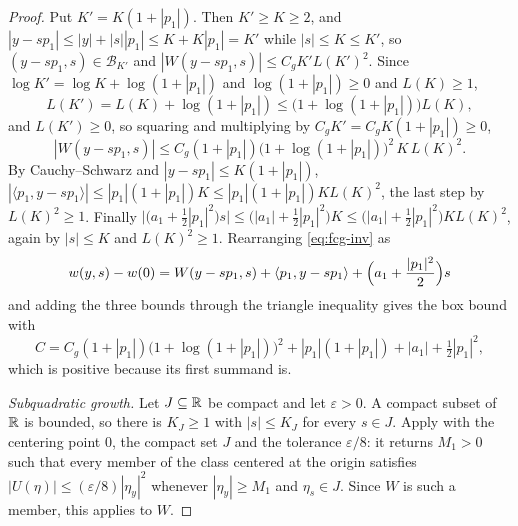 \begin{proof}
Put $K'=K(1+|p_1|)$. Then $K'\ge K\ge2$, and
$|y-sp_1|\le|y|+|s||p_1|\le K+K|p_1|=K'$ while $|s|\le K\le K'$, so
$(y-sp_1,s)\in\mathcal B_{K'}$ and
$|W(y-sp_1,s)|\le C_gK'L(K')^2$. Since $\log K'=\log K+\log(1+|p_1|)$ and
$\log(1+|p_1|)\ge0$ and $L(K)\ge1$,
\[
  L(K')=L(K)+\log(1+|p_1|)\le\bigl(1+\log(1+|p_1|)\bigr)L(K),
\]
and $L(K')\ge0$, so squaring and multiplying by $C_gK'=C_gK(1+|p_1|)\ge0$,
\[
  |W(y-sp_1,s)|\le C_g(1+|p_1|)\bigl(1+\log(1+|p_1|)\bigr)^2\,K\,L(K)^2 .
\]
By Cauchy--Schwarz and $|y-sp_1|\le K(1+|p_1|)$,
$|\langle p_1,y-sp_1\rangle|\le|p_1|(1+|p_1|)K\le|p_1|(1+|p_1|)KL(K)^2$, the
last step by $L(K)^2\ge1$. Finally
$\bigl|\bigl(a_1+\tfrac12|p_1|^2\bigr)s\bigr|
 \le\bigl(|a_1|+\tfrac12|p_1|^2\bigr)K
 \le\bigl(|a_1|+\tfrac12|p_1|^2\bigr)KL(K)^2$, again by $|s|\le K$ and
$L(K)^2\ge1$. Rearranging \eqref{eq:fcg-inv} as
\[
  w(y,s)-w(0)=W(y-sp_1,s)+\langle p_1,y-sp_1\rangle
    +\Bigl(a_1+\frac{|p_1|^2}{2}\Bigr)s
\]
and adding the three bounds through the triangle inequality gives the box bound
with
\[
  C=C_g(1+|p_1|)\bigl(1+\log(1+|p_1|)\bigr)^2+|p_1|(1+|p_1|)
     +|a_1|+\tfrac12|p_1|^2 ,
\]
which is positive because its first summand is.

\emph{Subquadratic growth.} Let $J\subseteq\mathbb{R}$ be compact and let
$\varepsilon>0$. A compact subset of $\mathbb{R}$ is bounded, so there is $K_J\ge1$ with
$|s|\le K_J$ for every $s\in J$. Apply  with the
centering point $0$, the compact set $J$ and the tolerance $\varepsilon/8$: it
returns $M_1>0$ such that every member of the class centered at the origin
satisfies $|U(\eta)|\le(\varepsilon/8)|\eta_y|^2$ whenever
$|\eta_y|\ge M_1$ and $\eta_s\in J$. Since $W$ is such a member, this applies to
$W$.


\end{proof}
